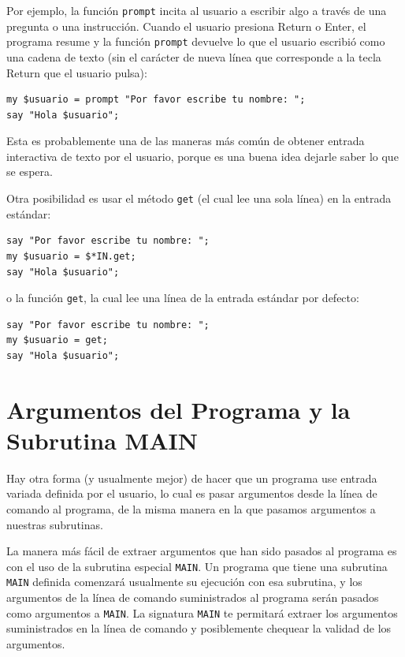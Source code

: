 Por ejemplo, la función {\tt prompt} incita al usuario a escribir
algo a través de una pregunta o una instrucción. Cuando el usuario 
presiona {\sf Return} o {\sf Enter}, el programa resume y 
la función \verb|prompt| devuelve lo que el usuario escribió 
como una cadena de texto (sin el carácter de nueva línea que 
corresponde a la tecla {\sf Return} que el usuario pulsa):

\begin{verbatim}
my $usuario = prompt "Por favor escribe tu nombre: ";
say "Hola $usuario";
\end{verbatim}
%

Esta es probablemente una de las maneras más común de
obtener entrada interactiva de texto por el usuario, porque
es una buena idea dejarle saber lo que se espera.

Otra posibilidad es usar el método {\tt get} (el cual lee
una sola línea) en la entrada estándar:

\begin{verbatim}
say "Por favor escribe tu nombre: ";
my $usuario = $*IN.get;
say "Hola $usuario";
\end{verbatim}
%
o la función {\tt get}, la cual lee una línea de la entrada
estándar por defecto:
\begin{verbatim}
say "Por favor escribe tu nombre: ";
my $usuario = get;
say "Hola $usuario";
\end{verbatim}
%

\section{Argumentos del Programa y la Subrutina MAIN}
\label{MAIN}

Hay otra forma (y usualmente mejor) de hacer que un programa
use entrada variada definida por el usuario, lo cual es 
pasar argumentos desde la línea de comando al programa, de 
la misma manera en la que pasamos argumentos a nuestras subrutinas.

La manera más fácil de extraer argumentos que han sido pasados
al programa es con el uso de la subrutina especial \verb|MAIN|.
Un programa que tiene una subrutina \verb|MAIN| definida
comenzará usualmente su ejecución con esa subrutina, y los argumentos
de la línea de comando suministrados al programa serán pasados
como argumentos a \verb|MAIN|. La signatura \verb|MAIN| te 
permitará extraer los argumentos suministrados en la línea de comando
y posiblemente chequear la validad de los argumentos. 

